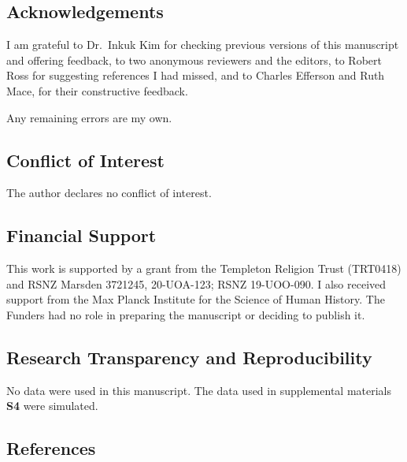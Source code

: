 \documentclass[
  single column]{article}
\begin{document}
\subsection{Acknowledgements}\label{acknowledgements}

I am grateful to Dr.~Inkuk Kim for checking previous versions of this
manuscript and offering feedback, to two anonymous reviewers and the
editors, to Robert Ross for suggesting references I had missed, and to
Charles Efferson and Ruth Mace, for their constructive feedback.

Any remaining errors are my own.

\subsection{Conflict of Interest}\label{conflict-of-interest}

The author declares no conflict of interest.

\subsection{Financial Support}\label{financial-support}

This work is supported by a grant from the Templeton Religion Trust
(TRT0418) and RSNZ Marsden 3721245, 20-UOA-123; RSNZ 19-UOO-090. I also
received support from the Max Planck Institute for the Science of Human
History. The Funders had no role in preparing the manuscript or deciding
to publish it.

\subsection{Research Transparency and
Reproducibility}\label{research-transparency-and-reproducibility}

No data were used in this manuscript. The data used in supplemental
materials \textbf{S4} were simulated.

\newpage{}

\subsection{References}\label{references}
\end{document}
